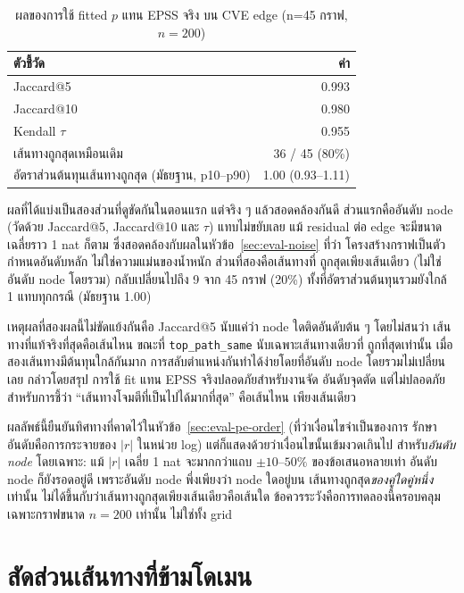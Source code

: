\begin{table}[H]
\centering
\caption{ผลของการใช้ fitted $p$ แทน EPSS จริง บน CVE edge (n=45 กราฟ, $n{=}200$)}\label{tab:exp6}
\small
\begin{tabular}{lr}
\toprule
ตัวชี้วัด & ค่า \\
\midrule
Jaccard@5 & 0.993 \\
Jaccard@10 & 0.980 \\
Kendall $\tau$ & 0.955 \\
เส้นทางถูกสุดเหมือนเดิม & 36 / 45 (80\%) \\
อัตราส่วนต้นทุนเส้นทางถูกสุด (มัธยฐาน, p10--p90) & 1.00 (0.93--1.11) \\
\bottomrule
\end{tabular}
\end{table}

ผลที่ได้แบ่งเป็นสองส่วนที่ดูขัดกันในตอนแรก แต่จริง ๆ แล้วสอดคล้องกันดี ส่วนแรกคืออันดับ
node (วัดด้วย Jaccard@5, Jaccard@10 และ $\tau$) แทบไม่ขยับเลย แม้ residual ต่อ edge
จะมีขนาดเฉลี่ยราว 1 nat ก็ตาม ซึ่งสอดคล้องกับผลในหัวข้อ~\ref{sec:eval-noise} ที่ว่า
โครงสร้างกราฟเป็นตัวกำหนดอันดับหลัก ไม่ใช่ความแม่นของน้ำหนัก ส่วนที่สองคือเส้นทางที่
ถูกสุดเพียงเส้นเดียว (ไม่ใช่อันดับ node โดยรวม) กลับเปลี่ยนไปถึง 9 จาก 45 กราฟ (20\%)
ทั้งที่อัตราส่วนต้นทุนรวมยังใกล้ 1 แทบทุกกรณี (มัธยฐาน 1.00)

เหตุผลที่สองผลนี้ไม่ขัดแย้งกันคือ Jaccard@5 นับแค่ว่า node ใดติดอันดับต้น ๆ โดยไม่สนว่า
เส้นทางที่แท้จริงที่สุดคือเส้นไหน ขณะที่ \texttt{top\_path\_same} นับเฉพาะเส้นทางเดียวที่
ถูกที่สุดเท่านั้น เมื่อสองเส้นทางมีต้นทุนใกล้กันมาก การสลับตำแหน่งกันทำได้ง่ายโดยที่อันดับ
node โดยรวมไม่เปลี่ยนเลย กล่าวโดยสรุป การใช้ fit แทน EPSS จริงปลอดภัยสำหรับงานจัด
อันดับจุดตัด แต่ไม่ปลอดภัยสำหรับการชี้ว่า ``เส้นทางโจมตีที่เป็นไปได้มากที่สุด'' คือเส้นไหน
เพียงเส้นเดียว

ผลลัพธ์นี้ยืนยันทิศทางที่คาดไว้ในหัวข้อ~\ref{sec:eval-pe-order} (ที่ว่าเงื่อนไขจำเป็นของการ
รักษาอันดับคือการกระจายของ $|r|$ ในหน่วย log) แต่ก็แสดงด้วยว่าเงื่อนไขนั้นเข้มงวดเกินไป
สำหรับ\emph{อันดับ node} โดยเฉพาะ: แม้ $|r|$ เฉลี่ย 1 nat จะมากกว่าแถบ $\pm10$--$50\%$
ของข้อเสนอหลายเท่า อันดับ node ก็ยังรอดอยู่ดี เพราะอันดับ node พึ่งเพียงว่า node ใดอยู่บน
เส้นทางถูกสุด\emph{ของคู่ใดคู่หนึ่ง}เท่านั้น ไม่ได้ขึ้นกับว่าเส้นทางถูกสุดเพียงเส้นเดียวคือเส้นใด
ข้อควรระวังคือการทดลองนี้ครอบคลุมเฉพาะกราฟขนาด $n=200$ เท่านั้น ไม่ใช่ทั้ง grid

\section{สัดส่วนเส้นทางที่ข้ามโดเมน}\label{sec:eval-cross}

